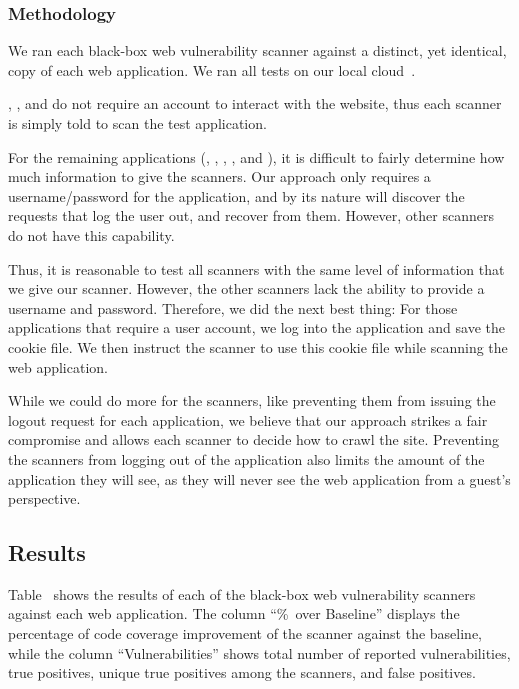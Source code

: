 \subsubsection{Methodology}

We ran each black-box web vulnerability scanner against a distinct, yet
identical, copy of each web application. We ran all tests on our local
cloud~\cite{nurmi09:eucalyptus}.

\gallery{}, \wordpresstwo{}, and \wordpress{} do not require an account to
interact with the website, thus each scanner is simply told to scan the test
application. 

For the remaining applications (\phpbbtwo{}, \phpbbthree{}, \scarf{},
\vanillaforums{}, and \wackopicko{}), it is difficult to fairly determine how
much information to give the scanners. Our approach only requires a
username/password for the application, and by its nature will discover the
requests that log the user out, and recover from them. However, other scanners
do not have this capability.

Thus, it is reasonable to test all scanners with the same level of information
that we give our scanner. However, the other scanners lack the ability to
provide a username and password. Therefore, we did the next best thing: For
those applications that require a user account, we log into the application and
save the cookie file. We then instruct the scanner to use this cookie file
while scanning the web application.

While we could do more for the scanners, like preventing them from issuing the
logout request for each application, we believe that our approach strikes a
fair compromise and allows each scanner to decide how to crawl the site.
Preventing the scanners from logging out of the application also limits the
amount of the application they will see, as they will never see the web
application from a guest's perspective. 

\subsection{Results}



Table~ shows the results of each of the black-box web
vulnerability scanners against each web application. The column ``\%~over Baseline''
displays the percentage of code coverage improvement of the scanner against the
\wget{} baseline, while the column ``Vulnerabilities'' shows total number of reported
vulnerabilities, true positives, unique true positives among the scanners, and
false positives. 

